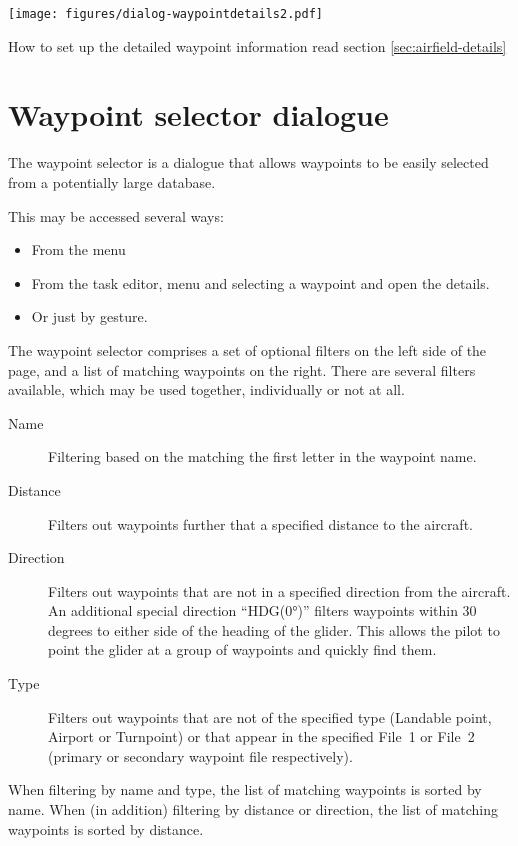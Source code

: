 \begin{center}
\texttt{[image: figures/dialog-waypointdetails2.pdf]}
\end{center}
How to set up the detailed waypoint information read section \ref{sec:airfield-details}

\section{Waypoint selector dialogue}\label{sec:waypoint-selector-dialog}
The waypoint selector is a dialogue that allows waypoints to be easily selected
from a potentially large database.

This may be accessed several ways:
\begin{itemize}
\item  From the menu \blink{}
\item  From the task editor, menu \blink{} 
  and selecting a waypoint and open the details.
\item  Or just by gesture.
\end{itemize}

The waypoint selector comprises a set of optional filters on the left
side of the page, and a list of matching waypoints on the right.
There are several filters available, which may be used together,
individually or not at all.
\begin{description}
\item[Name] Filtering based on the matching the first letter in the waypoint name. 
\item[Distance] Filters out waypoints further that a specified distance to the 
  aircraft.
\item[Direction] Filters out waypoints that are not in a specified direction 
  from the aircraft. 
  An additional special direction ``HDG(0°)'' filters waypoints within 30
  degrees to either side of the heading of the glider.  This allows the pilot 
  to point the glider at a group of waypoints and quickly find them.
\item[Type] Filters out waypoints that are not of the specified type
(Landable point, Airport or Turnpoint) or that appear in the specified File~1 or
File~2 (primary or secondary waypoint file respectively).
\end{description}
When filtering by name and type, the list of matching waypoints is
sorted by name. When (in addition) filtering by distance or direction,
 the list of matching waypoints is sorted by distance.

